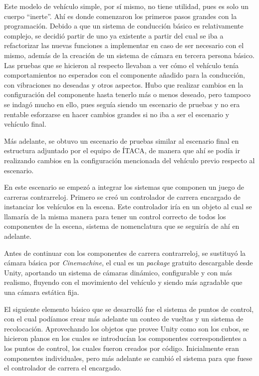 Este modelo de vehículo simple, por sí mismo, no tiene utilidad, pues es solo un cuerpo ``inerte''. Ahí es donde comenzaron los primeros pasos grandes con la programación. Debido a que un sistema de conducción básico es relativamente complejo, se decidió partir de uno ya existente a partir del cual se iba a refactorizar las nuevas funciones a implementar en caso de ser necesario con el mismo, además de la creación de un sistema de cámara en tercera persona básico. Las pruebas que se hicieron al respecto llevaban a ver cómo el vehículo tenía comportamientos no esperados con el componente añadido para la conducción, con vibraciones no deseadas y otros aspectos. Hubo que realizar cambios en la configuración del componente hasta tenerlo más o menos deseado, pero tampoco se indagó mucho en ello, pues seguía siendo un escenario de pruebas y no era rentable esforzarse en hacer cambios grandes si no iba a ser el escenario y vehículo final.

Más adelante, se obtuvo un escenario de pruebas similar al escenario final en estructura adjuntado por el equipo de ÍTACA, de manera que ahí se podía ir realizando cambios en la configuración mencionada del vehículo previo respecto al escenario. 

En este escenario se empezó a integrar los sistemas que componen un juego de carreras contrarreloj. Primero se creó un controlador de carrera encargado de instanciar los vehículos en la escena. Este controlador iría en un objeto al cual se llamaría de la misma manera para tener un control correcto de todos los componentes de la escena, sistema de nomenclatura que se seguiría de ahí en adelante. 

Antes de continuar con los componentes de carrera contrarreloj, se sustituyó la cámara básica por \textit{Cinemachine}, el cual es un \textit{package} gratuito descargable desde Unity, aportando un sistema de cámaras dinámico, configurable y con más realismo, fluyendo con el movimiento del vehículo y siendo más agradable que una cámara estática fija.

El siguiente elemento básico que se desarrolló fue el sistema de puntos de control, con el cual podíamos crear más adelante un conteo de vueltas y un sistema de recolocación. Aprovechando los objetos que provee Unity como son los cubos, se hicieron planos en los cuales se introducían los componentes correspondientes a los puntos de control, los cuales fueron creados por código. Inicialmente eran componentes individuales, pero más adelante se cambió el sistema para que fuese el controlador de carrera el encargado.

